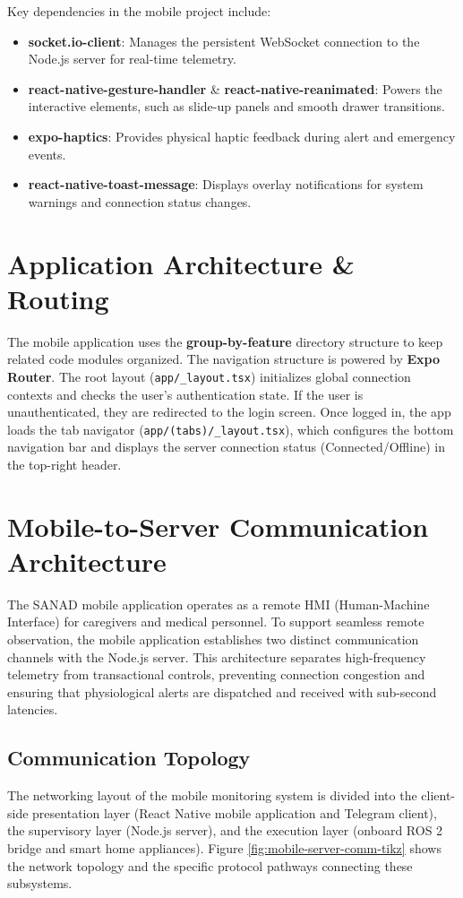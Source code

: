 Key dependencies in the mobile project include:
\begin{itemize}
    \item \textbf{socket.io-client}: Manages the persistent WebSocket connection to the Node.js server for real-time telemetry.
    \item \textbf{react-native-gesture-handler} \& \textbf{react-native-reanimated}: Powers the interactive elements, such as slide-up panels and smooth drawer transitions.
    \item \textbf{expo-haptics}: Provides physical haptic feedback during alert and emergency events.
    \item \textbf{react-native-toast-message}: Displays overlay notifications for system warnings and connection status changes.
\end{itemize}

\section{Application Architecture \& Routing}
The mobile application uses the \textbf{group-by-feature} directory structure to keep related code modules organized.
The navigation structure is powered by \textbf{Expo Router}. The root layout (\texttt{app/\_layout.tsx}) initializes global connection contexts and checks the user's authentication state. If the user is unauthenticated, they are redirected to the login screen. Once logged in, the app loads the tab navigator (\texttt{app/(tabs)/\_layout.tsx}), which configures the bottom navigation bar and displays the server connection status (Connected/Offline) in the top-right header.


\section{Mobile-to-Server Communication Architecture}
The SANAD mobile application operates as a remote HMI (Human-Machine Interface) for caregivers and medical personnel. To support seamless remote observation, the mobile application establishes two distinct communication channels with the Node.js server. This architecture separates high-frequency telemetry from transactional controls, preventing connection congestion and ensuring that physiological alerts are dispatched and received with sub-second latencies.

\subsection{Communication Topology}
The networking layout of the mobile monitoring system is divided into the client-side presentation layer (React Native mobile application and Telegram client), the supervisory layer (Node.js server), and the execution layer (onboard ROS 2 bridge and smart home appliances). Figure \ref{fig:mobile-server-comm-tikz} shows the network topology and the specific protocol pathways connecting these subsystems.

